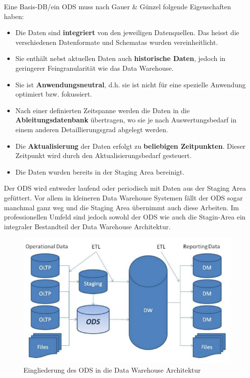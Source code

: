 \documentclass[a4paper, 11pt, nofootinbib]{article}
\begin{document}
Eine Basis-DB/ein ODS muss nach Gauer \& Günzel folgende Eigenschaften haben:
\begin{itemize}
	\item Die Daten sind \textbf{integriert} von den jeweiligen Datenquellen. Das heisst die verschiedenen Datenformate und Schematas wurden vereinheitlicht.
	\item Sie enthält nebst aktuellen Daten auch \textbf{historische Daten}, jedoch in geringerer Feingranularität wie das Data Warehouse.
	\item Sie ist \textbf{Anwendungsneutral}, d.h. sie ist nicht für eine spezielle Anwendung optimiert bzw. fokussiert.
	\item Nach einer definierten Zeitspanne werden die Daten in die \textbf{Ableitungsdatenbank} übertragen, wo sie je nach Auswertungsbedarf in einem anderen Detaillierungsgrad abgelegt werden.
	\item Die \textbf{Aktualisierung} der Daten erfolgt zu \textbf{beliebigen Zeitpunkten}. Dieser Zeitpunkt wird durch den Aktualisierungsbedarf gesteuert.
	\item Die Daten wurden bereits in der Staging Area bereinigt.
\end{itemize}

\vspace{10px}

\noindent Der ODS wird entweder laufend oder periodisch mit Daten aus der Staging Area gefüttert. Vor allem in kleineren Data Warehouse Systemen fällt der ODS sogar manchmal ganz weg und die Staging Area übernimmt auch diese Arbeiten. Im professionellen Umfeld sind jedoch sowohl der ODS wie auch die Stagin-Area ein integraler Bestandteil der Data Warehouse Architektur. 

\begin{figure}[htb]
	\centering
	\includegraphics[keepaspectratio=true,height=15\baselineskip]{ODS.png}
	\caption{Eingliederung des ODS in die Data Warehouse Architektur}
	\label{fig:ODS}
\end{figure}
\end{document}
